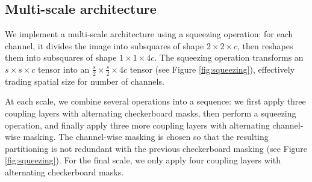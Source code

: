 \documentclass{article}
\newcommand{\jcom}[1]{\textcolor{darkgreen}{[jascha: #1]}}
\begin{document}

\subsection{Multi-scale architecture}
\label{section:multiscale}
We implement a multi-scale architecture using a squeezing operation: for each channel, it divides the image into subsquares of shape $2 \times 2 \times c$, then reshapes them into subsquares of shape $1 \times 1 \times 4c$. The squeezing operation transforms an $s \times s \times c$ tensor into an $\frac{s}{2} \times \frac{s}{2} \times 4c$ tensor (see Figure  \ref{fig:squeezing}), effectively trading spatial size for number of channels.

At each scale, we combine several operations into a sequence: we first apply three coupling layers with alternating checkerboard masks, then perform a squeezing operation, and finally apply three more coupling layers with alternating channel-wise masking. The channel-wise masking is chosen so that the resulting partitioning is not redundant with the previous checkerboard masking (see Figure \ref{fig:squeezing}). For the final scale, we only apply four coupling layers with alternating checkerboard masks. %
\end{document}

